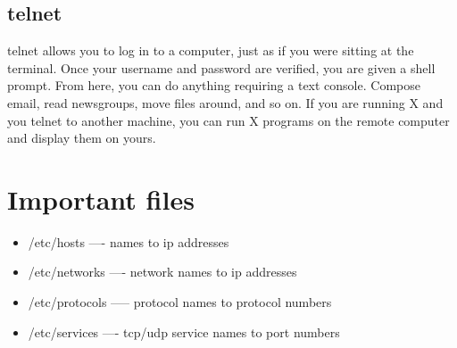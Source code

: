 \documentclass[a4paper,12pt]{article}
\begin{document}
    \subsection{telnet}
    telnet allows you to log in to a computer, just as if you were sitting at the terminal. Once your username and password are verified, you are given a shell prompt. From here, you can do anything requiring a text console. Compose email, read newsgroups, move files around, and so on. If you are running X and you telnet to another machine, you can run X programs on the remote computer and display them on yours.
    
    \section{Important files}
    
    \begin{itemize}
    \item /etc/hosts —- names to ip addresses
    
    \item /etc/networks —- network names to ip addresses
    
    \item /etc/protocols —– protocol names to protocol numbers
    
    \item  /etc/services —- tcp/udp service names to port numbers
    \end{itemize}
    
\end{document}
